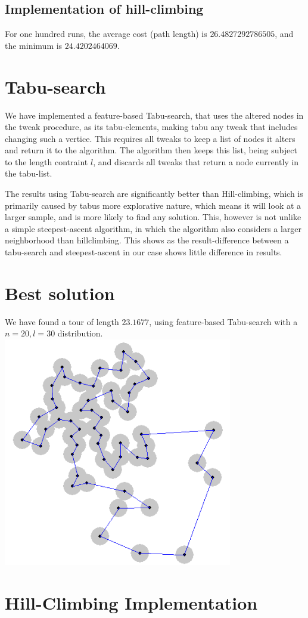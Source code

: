 \documentclass{article}
\begin{document}
\subsection{Implementation of hill-climbing}

For one hundred runs, the average cost (path length) is
$26.4827292786505$, and the minimum is $24.4202464069$.

\section{Tabu-search}
We have implemented a feature-based Tabu-search, that uses the altered nodes in the tweak procedure,
as its tabu-elements, making tabu any tweak that includes changing such a vertice.
This requires all tweaks to keep a list of nodes it alters and return it to the algorithm.
The algorithm then keeps this list, being subject to the length contraint $l$, and discards all tweaks that return
a node currently in the tabu-list.

The results using Tabu-search are significantly better than Hill-climbing, which is primarily caused by
tabus more explorative nature, which means it will look at a larger sample, and is more likely to find
any solution. This, however is not unlike a simple steepest-ascent algorithm, in which the algorithm
also considers a larger neighborhood than hillclimbing. This shows as the result-difference between a
tabu-search and steepest-ascent in our case shows little difference in results.

\section{Best solution}
We have found a tour of length $23.1677$, using feature-based Tabu-search with a $n=20,l=30$ distribution.\\
\includegraphics[width=100mm]{solution-2316.png}

\appendix

\section{Hill-Climbing Implementation}


\end{document}
